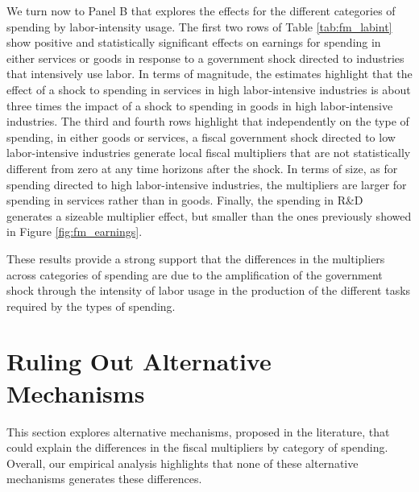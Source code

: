 \documentclass[dv_diss_main.tex]{subfiles}
\begin{document}
We turn now to Panel B that explores the effects for the different categories of spending by labor-intensity usage. The first two rows of Table \ref{tab:fm_labint} show positive and statistically significant effects on earnings for spending in either services or goods in response to a government shock directed to industries that intensively use labor. In terms of magnitude, the estimates highlight that the effect of a shock to spending in services in high labor-intensive industries is about three times the impact of a shock to spending in goods in high labor-intensive industries. The third and fourth rows highlight that independently on the type of spending, in either goods or services, a fiscal government shock directed to low labor-intensive industries generate local fiscal multipliers that are not statistically different from zero at any time horizons after the shock. In terms of size, as for spending directed to high labor-intensive industries, the multipliers are larger for spending in services rather than in goods. Finally, the spending in R\&D generates a sizeable multiplier effect, but smaller than the ones previously showed in Figure \ref{fig:fm_earnings}.

These results provide a strong support that the differences in the multipliers across categories of spending are due to the amplification of the government shock through the intensity of labor usage in the production of the different tasks required by the types of spending.










\section{Ruling Out Alternative Mechanisms}
\label{sec:emp_mec}

This section explores alternative mechanisms, proposed in the literature, that could explain the differences in the fiscal multipliers by category of spending. Overall, our empirical analysis highlights that none of these alternative mechanisms generates these differences.
\end{document}
